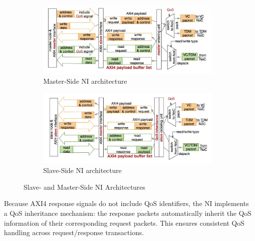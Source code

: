 \begin{figure}
    \centering
    \begin{subfigure}[b]{0.48\textwidth}
        \centering
        \includegraphics[width=\textwidth]{img/Master-Side_NI.png}
        \caption{Master-Side NI architecture}
        \label{fig:master_NI}
    \end{subfigure}
    \hfill
    \begin{subfigure}[b]{0.48\textwidth}
        \centering
        \includegraphics[width=\textwidth]{img/Slave-Side_NI.png}
        \caption{Slave-Side NI architecture}
        \label{fig:slave_NI}
    \end{subfigure}
    \caption{Slave- and Master-Side NI Architectures}
    \label{master_slave_ni}
\end{figure}


Because AXI4 response signals do not include QoS identifiers, the NI implements a QoS inheritance mechanism: the response packets automatically inherit the QoS information of their corresponding request packets. This ensures consistent QoS handling across request/response transactions.


